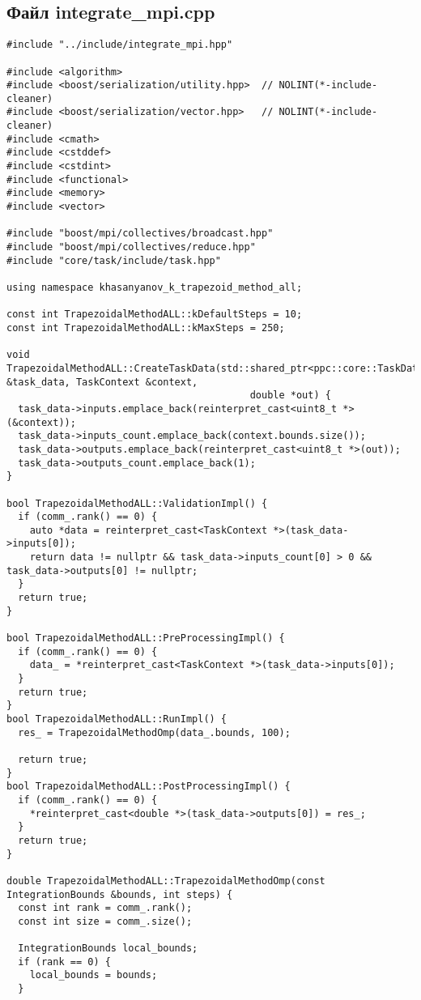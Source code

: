 \documentclass[a4paper,12pt]{article}
\begin{document}
\subsection*{Файл integrate\_mpi.cpp}
\begin{lstlisting}
#include "../include/integrate_mpi.hpp"

#include <algorithm>
#include <boost/serialization/utility.hpp>  // NOLINT(*-include-cleaner)
#include <boost/serialization/vector.hpp>   // NOLINT(*-include-cleaner)
#include <cmath>
#include <cstddef>
#include <cstdint>
#include <functional>
#include <memory>
#include <vector>

#include "boost/mpi/collectives/broadcast.hpp"
#include "boost/mpi/collectives/reduce.hpp"
#include "core/task/include/task.hpp"

using namespace khasanyanov_k_trapezoid_method_all;

const int TrapezoidalMethodALL::kDefaultSteps = 10;
const int TrapezoidalMethodALL::kMaxSteps = 250;

void TrapezoidalMethodALL::CreateTaskData(std::shared_ptr<ppc::core::TaskData> &task_data, TaskContext &context,
                                          double *out) {
  task_data->inputs.emplace_back(reinterpret_cast<uint8_t *>(&context));
  task_data->inputs_count.emplace_back(context.bounds.size());
  task_data->outputs.emplace_back(reinterpret_cast<uint8_t *>(out));
  task_data->outputs_count.emplace_back(1);
}

bool TrapezoidalMethodALL::ValidationImpl() {
  if (comm_.rank() == 0) {
    auto *data = reinterpret_cast<TaskContext *>(task_data->inputs[0]);
    return data != nullptr && task_data->inputs_count[0] > 0 && task_data->outputs[0] != nullptr;
  }
  return true;
}

bool TrapezoidalMethodALL::PreProcessingImpl() {
  if (comm_.rank() == 0) {
    data_ = *reinterpret_cast<TaskContext *>(task_data->inputs[0]);
  }
  return true;
}
bool TrapezoidalMethodALL::RunImpl() {
  res_ = TrapezoidalMethodOmp(data_.bounds, 100);

  return true;
}
bool TrapezoidalMethodALL::PostProcessingImpl() {
  if (comm_.rank() == 0) {
    *reinterpret_cast<double *>(task_data->outputs[0]) = res_;
  }
  return true;
}

double TrapezoidalMethodALL::TrapezoidalMethodOmp(const IntegrationBounds &bounds, int steps) {
  const int rank = comm_.rank();
  const int size = comm_.size();

  IntegrationBounds local_bounds;
  if (rank == 0) {
    local_bounds = bounds;
  }


\end{lstlisting}
\end{document}
